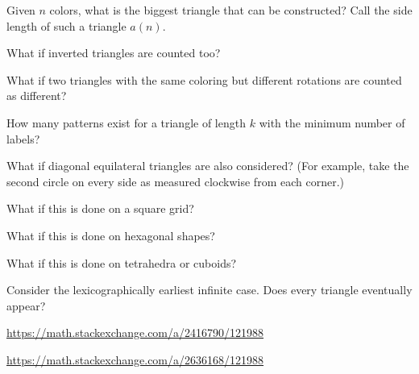 \documentclass{article}
\begin{document}
\begin{question}
  Given $n$ colors, what is the biggest triangle that can be constructed?
  Call the side length of such a triangle $a(n)$.
\end{question}
\begin{related}
  \item What if inverted triangles are counted too?
  \item What if two triangles with the same coloring but different rotations are
    counted as different?
  \item How many patterns exist for a triangle of length $k$ with the minimum
    number of labels?
  \item What if diagonal equilateral triangles are also considered?
    (For example, take the second circle on every side as measured clockwise
    from each corner.)
  \item What if this is done on a square grid?
  \item What if this is done on hexagonal shapes?
  \item What if this is done on tetrahedra or cuboids?
  \item Consider the lexicographically earliest infinite case. Does every
    triangle eventually appear?
\end{related}
\begin{references}
  \item \url{https://math.stackexchange.com/a/2416790/121988}
  \item \url{https://math.stackexchange.com/a/2636168/121988}
\end{references}
\end{document}
